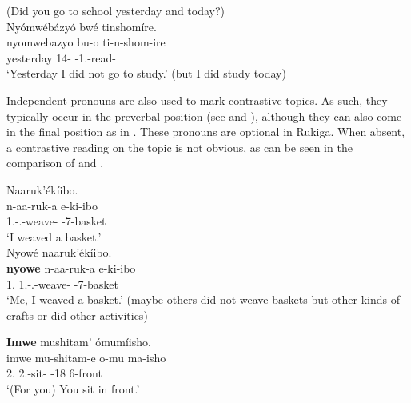 \documentclass[output=paper]{langscibook}
\begin{document}
\ea
\label{bkm:Ref135651945}
(Did you go to school yesterday and today?)\\
Nyómwébázyó bwé tinshomíre.\\
\gll
nyomwebazyo  bu-o  ti-n-shom-ire\\
yesterday  14-\CM{}  \NEG{}-1\SG{}.\SM{}-read-\PFV{}\\
\glt
‘Yesterday I did not go to study.’ (but I did study today)\\

\z

Independent pronouns are also used to mark contrastive topics. As such, they typically occur in the preverbal position (see  and ), although they can also come in the final position as in . These pronouns are optional in Rukiga. When absent, a contrastive reading on the topic is not obvious, as can be seen in the comparison of  and .

\ea
\label{bkm:Ref113439970}
\ea
\label{bkm:Ref113439970:a}
Naaruk’ékíibo.\\
\gll
n-aa-ruk-a  e-ki-ibo\\
1\SG{}.\SM{}-\N{}.\PST{}-weave-\FV{}  \AUG{}-7-basket\\
\glt
‘I weaved a basket.’\\

\ex
\label{bkm:Ref113439970:b}
Nyowé naaruk’ékíibo.\\
\gll
\textbf{nyowe}  n-aa-ruk-a  e-ki-ibo\\
1\SG{}.\PRO{}  1\SG{}.\SM{}-\N{}.\PST{}-weave-\FV{}  \AUG{}-7-basket\\
\glt
‘Me, I weaved a basket.’ (maybe others did not weave baskets but other kinds of crafts or did other activities)\\

\z
\z

\ea
\label{bkm:Ref113439996}
\ea
\label{bkm:Ref113439996:a}
\textbf{Imwe} mushitam’ ómumíisho.\\
\gll
imwe  mu-shitam-e  o-mu  ma-isho\\
2\PL{}.\PRO{}  2\PL{}.\SM{}-sit-\SBJV{}  \AUG{}-18  6-front\\
\glt
‘(For you) You sit in front.’\\
\end{document}

